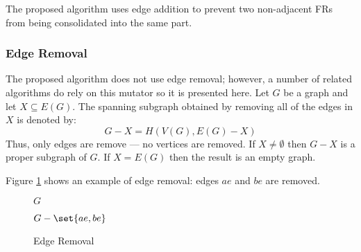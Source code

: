 The proposed algorithm uses edge addition to prevent two non-adjacent FRs from being consolidated into the same
part.

\subsubsection{Edge Removal}

The proposed algorithm does not use edge removal; however, a number of related algorithms do rely on this mutator
so it is presented here.  Let \(G\) be a graph and let \(X\subseteq E(G)\).  The spanning subgraph obtained by
removing all of the edges in \(X\) is denoted by:
\[G-X=H\left(V(G),E(G)-X\right)\]
Thus, only edges are remove --- no vertices are removed.  If \(X\ne\emptyset\) then \(G-X\) is a proper subgraph of
\(G\).  If \(X=E(G)\) then the result is an empty graph.

Figure \ref{fig:eremove} shows an example of edge removal: edges \(ae\) and \(be\) are removed.

\begin{figure}[h]
  \label{fig:eremove}
  \begin{minipage}{3in}
    \begin{center}

      \bigskip

      \(G\)
    \end{center}
  \end{minipage}
  \begin{minipage}{3in}
    \begin{center}

      \bigskip

      \(G-\set{ae,be}\)
    \end{center}
  \end{minipage}
  \caption{Edge Removal}
\end{figure}

